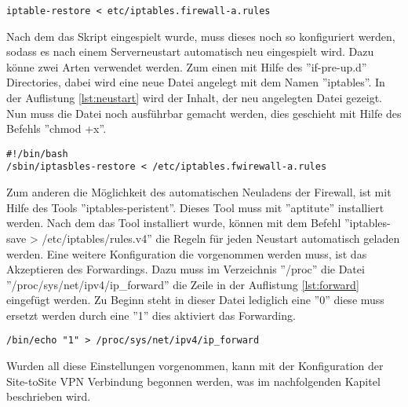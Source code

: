 \lstset{
	basicstyle=\footnotesize, frame=tb,
	xleftmargin=.2\textwidth, xrightmargin=.2\textwidth
}
\begin{lstlisting}[caption={Einspielen des Firewallskriptes der Firma a},label=lst:fwrestorea]
iptable-restore < etc/iptables.firewall-a.rules
\end{lstlisting}
\vspace{\baselineskip}
Nach dem das Skript eingespielt wurde, muss dieses noch so konfiguriert werden, sodass es nach einem Serverneustart automatisch neu eingespielt wird. Dazu könne zwei Arten verwendet werden. Zum einen mit Hilfe des ''if-pre-up.d'' Directories, dabei wird eine neue Datei angelegt mit dem Namen ''iptables''. In der Auflistung \ref{lst:neustart} wird der Inhalt, der neu angelegten Datei gezeigt. Nun muss die Datei noch ausführbar gemacht werden, dies geschieht mit Hilfe des Befehls ''chmod +x''.
\newline
\lstset{
	basicstyle=\footnotesize, frame=tb,
	xleftmargin=.2\textwidth, xrightmargin=.2\textwidth
}
\begin{lstlisting}[caption={Automatisches Laden des Iptablesskriptes bei Serverneustart},label=lst:neustart]
#!/bin/bash
/sbin/iptasbles-restore < /etc/iptables.fwirewall-a.rules
\end{lstlisting}
\vspace{\baselineskip}
Zum anderen die Möglichkeit des automatischen Neuladens der Firewall, ist mit Hilfe des Tools ''iptables-peristent''. Dieses Tool muss mit ''aptitute'' installiert werden. Nach dem das Tool installiert wurde, können mit dem Befehl ''iptables-save > /etc/iptables/rules.v4'' die Regeln für jeden Neustart automatisch geladen werden. 
\newline 
Eine weitere Konfiguration die vorgenommen werden muss, ist das Akzeptieren des Forwardings. Dazu muss im Verzeichnis ''/proc'' die Datei ''/proc/sys/net/ipv4/ip\_forward'' die Zeile in der Auflistung \ref{lst:forward} eingefügt werden. Zu Beginn steht in dieser Datei lediglich eine ''0'' diese muss ersetzt werden durch eine ''1'' dies aktiviert das Forwarding.\newline
\lstset{
	basicstyle=\footnotesize, frame=tb,
	xleftmargin=.2\textwidth, xrightmargin=.2\textwidth
}
\begin{lstlisting}[caption={Forwarding aktivieren},label=lst:forward]
/bin/echo "1" > /proc/sys/net/ipv4/ip_forward
\end{lstlisting}
\vspace{\baselineskip}
Wurden all diese Einstellungen vorgenommen, kann  mit der Konfiguration der Site-toSite VPN Verbindung begonnen werden, was im nachfolgenden Kapitel beschrieben wird.



